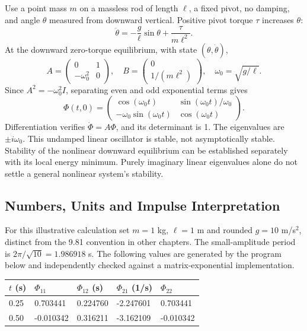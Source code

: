 Use a point mass $m$ on a massless rod of length $\ell$, a fixed pivot, no damping, and angle $\theta$ measured from downward vertical. Positive pivot torque $\tau$ increases $\theta$:
\begin{equation}
\ddot\theta=-\frac g\ell\sin\theta+\frac{\tau}{m\ell^2}.
\end{equation}
At the downward zero-torque equilibrium, with state $(\theta,\dot\theta)$,
\begin{equation}
A=\begin{pmatrix}0&1\\-\omega_0^2&0\end{pmatrix},
\quad B=\begin{pmatrix}0\\1/(m\ell^2)\end{pmatrix},
\quad \omega_0=\sqrt{g/\ell}.
\end{equation}
Since $A^2=-\omega_0^2I$, separating even and odd exponential terms gives
\begin{equation}
\Phi(t,0)=\begin{pmatrix}
\cos(\omega_0t)&\sin(\omega_0t)/\omega_0\\
-\omega_0\sin(\omega_0t)&\cos(\omega_0t)
\end{pmatrix}.
\label{eq:ch2:pend-stm}
\end{equation}
Differentiation verifies $\dot\Phi=A\Phi$, and its determinant is 1. The eigenvalues are $\pm i\omega_0$. This undamped linear oscillator is stable, not asymptotically stable. Stability of the nonlinear downward equilibrium can be established separately with its local energy minimum. Purely imaginary linear eigenvalues alone do not settle a general nonlinear system's stability.

\subsection{Numbers, Units and Impulse Interpretation}

For this illustrative calculation set $m=1$ kg, $\ell=1$ m and rounded $g=10$ m/s$^2$, distinct from the 9.81 convention in other chapters. The small-amplitude period is $2\pi/\sqrt{10}=1.986918$ s. The following values are generated by the program below and independently checked against a matrix-exponential implementation.

\begin{center}
\small
\begin{tabular}{lllll}
\toprule
$t$ (s) & $\Phi_{11}$ & $\Phi_{12}$ (s) & $\Phi_{21}$ (1/s) & $\Phi_{22}$ \\
\midrule
0.25 & 0.703441 & 0.224760 & -2.247601 & 0.703441 \\
0.50 & -0.010342 & 0.316211 & -3.162109 & -0.010342 \\
\bottomrule
\end{tabular}
\end{center}

